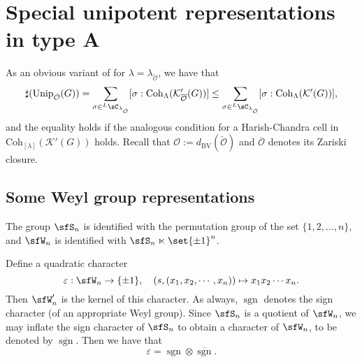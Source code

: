 \documentclass[12pt,a4paper]{amsart}
\newcommand{\CK}{{\mathcal {K}}}
\newcommand{\CO}{{\mathcal {O}}}
\newcommand{\sgn}{\operatorname{sgn}}
\newcommand{\g}{\mathfrak g}
\newcommand{\be}{\begin {equation}}
\newcommand{\ee}{\end {equation}}
\numberwithin{equation}{section}
\theoremstyle{remark}
\def\Unip{\mathrm{Unip}}
\def\dBV{d_{\mathrm{BV}}}
\def\LC{{}^{\scriptscriptstyle L}\sC}
\def\bsgn{\overline{\sgn}}
\def\Coh{\mathrm{Coh}}
\def\Inn{\mathrm{Ad}}
\newcommand{\Lam}{{[\lambda]}}
\begin{document}
\section{Special unipotent representations in type A}\label{sec:GL}





As an obvious variant of  for $\lambda=\lambda_{\check \CO}$, we have  that
 \begin{equation}\label{boundc22}
     \sharp(\Unip_{\check \CO}(G)) =\sum_{\sigma\in \LC_{\lambda_{\check \CO}}} [\sigma: \Coh_{\Lambda}(\CK_{\overline{\CO}}'(G))]  \leq \sum_{\sigma\in \LC_{\lambda_{\check \CO}}} [\sigma: \Coh_{\Lambda}(\CK'(G))],
   \end{equation}
   and the equality holds if the analogous condition for a Harish-Chandra cell in $\Coh_{\Lam}(\CK'(G))$ holds.
Recall that $\CO:=\dBV(\check \CO)$ and $\overline{\CO}$ denotes its Zariski closure.



\subsection{Some Weyl group representations}


The group $\sfS_n$ is  identified with the permutation group of the set $\{1,2, \dots, n\}$, and
 $\sfW_n$ is identified with $\sfS_n \ltimes \set{\pm 1}^n$.

 Define a quadratic character
\be\label{defep}
  \varepsilon: \sfW_n\rightarrow \{\pm 1\}, \quad (s,(x_{1}, x_{2}, \cdots, x_{n}))\mapsto x_{1}x_{2}\cdots x_{n}.
\ee
Then $\sfW_n'$ is the kernel of this character. As always, $\sgn$ denotes the sign character (of an appropriate Weyl group).
Since $\sfS_{n}$ is a quotient of $\sfW_{n}$, we may inflate the sign character of $\sfS_{n}$ to obtain a character of $\sfW_{n}$, to be denoted by $\bsgn$. Then we have that
\[\varepsilon = \sgn \otimes \bsgn.\]
\end{document}

